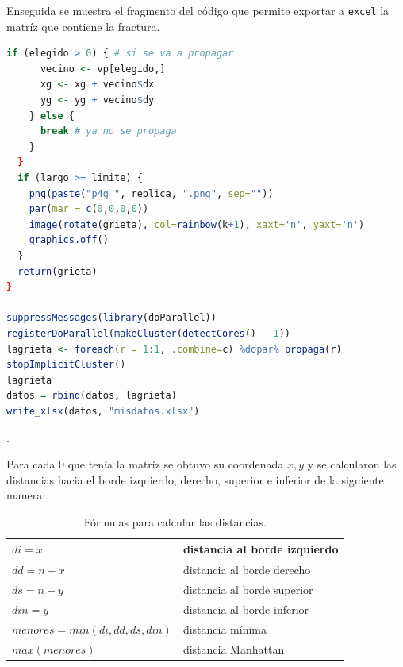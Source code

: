 \documentclass{article}
\begin{document}
Enseguida se muestra el fragmento del código que permite exportar a \texttt{excel} la matríz que contiene la fractura. 


\lstset{style=mystyle}
\begin{lstlisting}[language=R, caption= Código para exportar la matríz de la fractura a \texttt{excel}.]
    if (elegido > 0) { # si se va a propagar
      vecino <- vp[elegido,]
      xg <- xg + vecino$dx
      yg <- yg + vecino$dy
    } else {
      break # ya no se propaga
    }
  }
  if (largo >= limite) {
    png(paste("p4g_", replica, ".png", sep=""))
    par(mar = c(0,0,0,0))
    image(rotate(grieta), col=rainbow(k+1), xaxt='n', yaxt='n')
    graphics.off()
  }
  return(grieta)
}

suppressMessages(library(doParallel))
registerDoParallel(makeCluster(detectCores() - 1))
lagrieta <- foreach(r = 1:1, .combine=c) %dopar% propaga(r)
stopImplicitCluster()
lagrieta
datos = rbind(datos, lagrieta)
write_xlsx(datos, "misdatos.xlsx")

\end{lstlisting}

\newpage
.
\bigskip

Para cada $0$ que tenía la matríz se obtuvo su coordenada $x, y$ y se calcularon las distancias hacia el borde izquierdo, derecho, superior e inferior de la siguiente manera:

\begin{table}[ht]
\centering
\caption{Fórmulas para calcular las distancias.}
\smallskip

 \begin{tabular}{ |p{5cm}|p{5cm}|}
 \hline
 $di = x$ & distancia al borde izquierdo \\
 \hline
 $dd = n - x$ & distancia al borde derecho \\
 \hline
 $ds = n - y$ & distancia al borde superior \\
 \hline
 $din= y$ & distancia al borde inferior \\
 \hline
 $menores = min(di, dd, ds, din)$ & distancia mínima \\
 \hline
 $max(menores)$ & distancia Manhattan \\
 \hline
\end{tabular}
\label{Cuadro 2}
\end{table}
\end{document}

